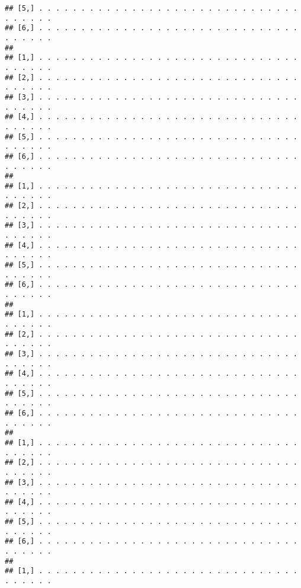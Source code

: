 \documentclass[
]{book}
\begin{document}
\begin{verbatim}
## [5,] . . . . . . . . . . . . . . . . . . . . . . . . . . . . . . . . . . . . .
## [6,] . . . . . . . . . . . . . . . . . . . . . . . . . . . . . . . . . . . . .
##                                                                               
## [1,] . . . . . . . . . . . . . . . . . . . . . . . . . . . . . . . . . . . . .
## [2,] . . . . . . . . . . . . . . . . . . . . . . . . . . . . . . . . . . . . .
## [3,] . . . . . . . . . . . . . . . . . . . . . . . . . . . . . . . . . . . . .
## [4,] . . . . . . . . . . . . . . . . . . . . . . . . . . . . . . . . . . . . .
## [5,] . . . . . . . . . . . . . . . . . . . . . . . . . . . . . . . . . . . . .
## [6,] . . . . . . . . . . . . . . . . . . . . . . . . . . . . . . . . . . . . .
##                                                                               
## [1,] . . . . . . . . . . . . . . . . . . . . . . . . . . . . . . . . . . . . .
## [2,] . . . . . . . . . . . . . . . . . . . . . . . . . . . . . . . . . . . . .
## [3,] . . . . . . . . . . . . . . . . . . . . . . . . . . . . . . . . . . . . .
## [4,] . . . . . . . . . . . . . . . . . . . . . . . . . . . . . . . . . . . . .
## [5,] . . . . . . . . . . . . . . . . . . . . . . . . . . . . . . . . . . . . .
## [6,] . . . . . . . . . . . . . . . . . . . . . . . . . . . . . . . . . . . . .
##                                                                               
## [1,] . . . . . . . . . . . . . . . . . . . . . . . . . . . . . . . . . . . . .
## [2,] . . . . . . . . . . . . . . . . . . . . . . . . . . . . . . . . . . . . .
## [3,] . . . . . . . . . . . . . . . . . . . . . . . . . . . . . . . . . . . . .
## [4,] . . . . . . . . . . . . . . . . . . . . . . . . . . . . . . . . . . . . .
## [5,] . . . . . . . . . . . . . . . . . . . . . . . . . . . . . . . . . . . . .
## [6,] . . . . . . . . . . . . . . . . . . . . . . . . . . . . . . . . . . . . .
##                                                                               
## [1,] . . . . . . . . . . . . . . . . . . . . . . . . . . . . . . . . . . . . .
## [2,] . . . . . . . . . . . . . . . . . . . . . . . . . . . . . . . . . . . . .
## [3,] . . . . . . . . . . . . . . . . . . . . . . . . . . . . . . . . . . . . .
## [4,] . . . . . . . . . . . . . . . . . . . . . . . . . . . . . . . . . . . . .
## [5,] . . . . . . . . . . . . . . . . . . . . . . . . . . . . . . . . . . . . .
## [6,] . . . . . . . . . . . . . . . . . . . . . . . . . . . . . . . . . . . . .
##                                                                               
## [1,] . . . . . . . . . . . . . . . . . . . . . . . . . . . . . . . . . . . . .

\end{verbatim}
\end{document}
